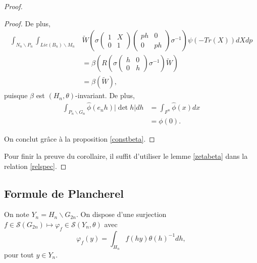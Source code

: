 \documentclass{amsart}
\begin{document}
\begin{proof}
\begin{proof}
De plus,
\begin{equation}
\begin{split}
\int_{N_n \backslash P_n} \int_{Lie(B_n) \backslash M_n} &\widetilde{W}\left(\sigma\begin{pmatrix}
1 & X \\
0 & 1
\end{pmatrix} \begin{pmatrix}
ph & 0 \\
0 & ph
\end{pmatrix} \sigma^{-1}\right) \psi(-Tr(X)) dX dp \\
&= \beta\left(R\left(\sigma \begin{pmatrix}
h & 0 \\
0 & h
\end{pmatrix} \sigma^{-1}\right) \widetilde{W}\right) \\
&= \beta(\widetilde{W}),
\end{split}
\end{equation}
puisque $\beta$ est $(H_n, \theta)$-invariant. De plus,
\begin{equation}
\begin{split}
\int_{P_n \backslash G_n}  \widehat{\phi}(e_nh) |\det h| dh &= \int_{F^n} \widehat{\phi}(x) dx \\
&= \phi(0).
\end{split}
\end{equation}

On conclut grâce à la proposition \ref{constbeta}.
\end{proof}

Pour finir la preuve du corollaire, il suffit d'utiliser le lemme \ref{zetabeta} dans la relation \ref{relspec}.
\end{proof}

\subsection{Formule de Plancherel}

On note $Y_n = H_n \backslash G_{2n}$. On dispose d'une surjection $f \in \mathcal{S}(G_{2n}) \mapsto \varphi_f \in \mathcal{S}(Y_n, \theta)$ avec
\begin{equation}
\varphi_f(y) = \int_{H_n} f(hy) \theta(h)^{-1} dh,
\end{equation}
pour tout $y \in Y_n$. 
\end{document}
